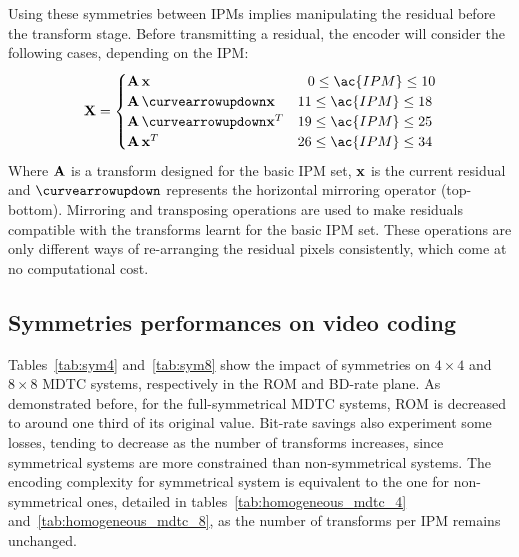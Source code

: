 \documentclass[11pt,a4paper,openright,twoside]{book}
\numberwithin{equation}{section} %
\numberwithin{figure}{section} %
\numberwithin{table}{section} %
\begin{document}
Using these symmetries between \acp{IPM} implies manipulating the residual
before the transform stage.
Before transmitting a residual, the encoder will consider the following cases,
depending on the \ac{IPM}:
\begin{equation}
	\X =
	\begin{cases}
		\A \, \x & \;\;\, 0 \le \ac{IPM} \le 10 \\
		\A \, \curvearrowupdown\x & 11 \le \ac{IPM} \le 18 \\
		\A \, \curvearrowupdown\x^T & 19 \le \ac{IPM} \le 25 \\
		\A \, \x^T & 26 \le \ac{IPM} \le 34 \\
	\end{cases}
\end{equation}
Where $\mathbf{A}$ is a transform designed for the basic IPM set, $\mathbf{x}$ is the current
residual and $\curvearrowupdown$ represents the horizontal mirroring operator
(top-bottom).
Mirroring and transposing operations are used to make residuals compatible
with the transforms learnt for the basic IPM set.
These operations are only different ways of re-arranging the residual pixels
consistently, which come at no computational cost.

\subsection{Symmetries performances on video coding}
\label{sub:symmetries_performances_on_video_coding}

Tables~\ref{tab:sym4} and~\ref{tab:sym8} show the impact of symmetries on
$4\times4$ and $8\times8$ \ac{MDTC} systems, respectively in the \acs{ROM} and
\ac{BD}-rate plane.
As demonstrated before, for the full-symmetrical \ac{MDTC} systems, \acs{ROM}
is decreased to around one third of its original value.
Bit-rate savings also experiment some losses, tending to decrease as the
number of transforms increases, since symmetrical systems are more constrained
than non-symmetrical systems.
The encoding complexity for symmetrical system is equivalent to the one for
non-symmetrical ones, detailed in tables~\ref{tab:homogeneous_mdtc_4}
and~\ref{tab:homogeneous_mdtc_8}, as the number of transforms per \ac{IPM}
remains unchanged.
\end{document}
